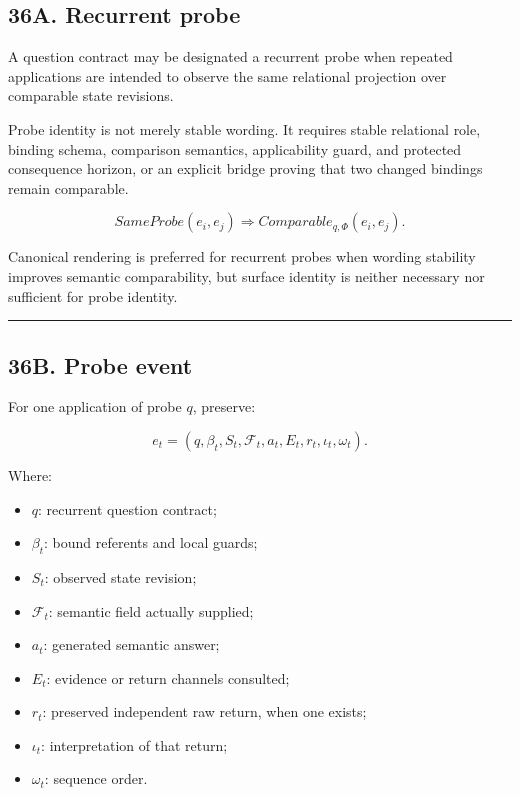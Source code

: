 \documentclass[
]{article}
\providecommand{\tightlist}{%
  \setlength{\itemsep}{0pt}\setlength{\parskip}{0pt}}
\begin{document}
\subsection{36A. Recurrent probe}\label{recurrent-probe}

A question contract may be designated a recurrent probe when repeated
applications are intended to observe the same relational projection over
comparable state revisions.

Probe identity is not merely stable wording. It requires stable relational role,
binding schema, comparison semantics, applicability guard, and protected
consequence horizon, or an explicit bridge proving that two changed bindings
remain comparable.

\[
\boxed{
SameProbe(e_i,e_j)
\Rightarrow
Comparable_{q,\Phi}(e_i,e_j).
}
\]

Canonical rendering is preferred for recurrent probes when wording stability
improves semantic comparability, but surface identity is neither necessary nor
sufficient for probe identity.

\begin{center}\rule{0.5\linewidth}{0.5pt}\end{center}

\subsection{36B. Probe event}\label{probe-event}

For one application of probe \(q\), preserve:

\[
\boxed{
e_t=
(
q,
\beta_t,
S_t,
\mathcal F_t,
a_t,
E_t,
r_t,
\iota_t,
\omega_t
).
}
\]

Where:

\begin{itemize}
\tightlist
\item \(q\): recurrent question contract;
\item \(\beta_t\): bound referents and local guards;
\item \(S_t\): observed state revision;
\item \(\mathcal F_t\): semantic field actually supplied;
\item \(a_t\): generated semantic answer;
\item \(E_t\): evidence or return channels consulted;
\item \(r_t\): preserved independent raw return, when one exists;
\item \(\iota_t\): interpretation of that return;
\item \(\omega_t\): sequence order.
\end{itemize}
\end{document}

